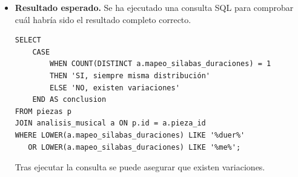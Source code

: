 \begin{itemize}
*   En ""568.mscz"" y ""582.mscz"", la sílaba ""me"" se asocia con múltiples duraciones de nota (ej. `[0.25, 0.5]` y `[0.5, 1.5]` respectivamente).
*   En ""570.mscz"", ""571.mscz"", ""573.mscz"", ""576.mscz"", ""578.mscz"" y ""594.mscz"", la sílaba ""me"" se asigna a una duración de `[0.5]`.
*   En ""590.mscz"", la sílaba ""me"" se asigna a una duración de `[1.0]`.

Por lo tanto, la sílaba ""me"" no se asigna siempre a la misma duración de nota; su duración varía en diferentes archivos del dataset."  
\item \textbf{Resultado esperado.} Se ha ejecutado una consulta SQL para comprobar cuál habría sido el resultado completo correcto.
    \begin{verbatim}
SELECT 
    CASE 
        WHEN COUNT(DISTINCT a.mapeo_silabas_duraciones) = 1 
        THEN 'SI, siempre misma distribución'
        ELSE 'NO, existen variaciones'
    END AS conclusion
FROM piezas p
JOIN analisis_musical a ON p.id = a.pieza_id
WHERE LOWER(a.mapeo_silabas_duraciones) LIKE '%duer%'
   OR LOWER(a.mapeo_silabas_duraciones) LIKE '%me%';
    \end{verbatim}    
    Tras ejecutar la consulta se puede asegurar que existen variaciones.

\end{itemize}

